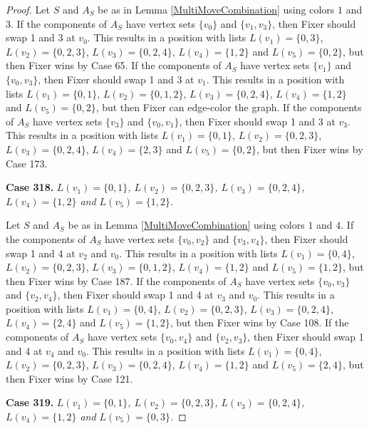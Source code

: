 \documentclass[12pt]{amsart}
\theoremstyle{plain}
\theoremstyle{definition}
\theoremstyle{remark}
\begin{document}
\begin{proof}
Let $S$ and $A_S$ be as in Lemma \ref{MultiMoveCombination} using colors $1$ and $3$. If the components of $A_S$ have vertex sets $\{v_0\}$ and $\{v_1, v_3\}$, then Fixer should swap 1 and 3 at $v_0$. This results in a position with lists $L(v_1) = \{0, 3\}$, $L(v_2) = \{0, 2, 3\}$, $L(v_3) = \{0, 2, 4\}$, $L(v_4) = \{1, 2\}$ and $L(v_5) = \{0, 2\}$, but then Fixer wins by Case 65. If the components of $A_S$ have vertex sets $\{v_1\}$ and $\{v_0, v_3\}$, then Fixer should swap 1 and 3 at $v_1$. This results in a position with lists $L(v_1) = \{0, 1\}$, $L(v_2) = \{0, 1, 2\}$, $L(v_3) = \{0, 2, 4\}$, $L(v_4) = \{1, 2\}$ and $L(v_5) = \{0, 2\}$, but then Fixer can edge-color the graph. If the components of $A_S$ have vertex sets $\{v_3\}$ and $\{v_0, v_1\}$, then Fixer should swap 1 and 3 at $v_3$. This results in a position with lists $L(v_1) = \{0, 1\}$, $L(v_2) = \{0, 2, 3\}$, $L(v_3) = \{0, 2, 4\}$, $L(v_4) = \{2, 3\}$ and $L(v_5) = \{0, 2\}$, but then Fixer wins by Case 173. 

\noindent\textbf{Case 318.  }\textit{$L(v_1) = \{0, 1\}$, $L(v_2) = \{0, 2, 3\}$, $L(v_3) = \{0, 2, 4\}$, $L(v_4) = \{1, 2\}$ and $L(v_5) = \{1, 2\}$.}

Let $S$ and $A_S$ be as in Lemma \ref{MultiMoveCombination} using colors $1$ and $4$. If the components of $A_S$ have vertex sets $\{v_0, v_2\}$ and $\{v_3, v_4\}$, then Fixer should swap 1 and 4 at $v_2$ and $v_0$. This results in a position with lists $L(v_1) = \{0, 4\}$, $L(v_2) = \{0, 2, 3\}$, $L(v_3) = \{0, 1, 2\}$, $L(v_4) = \{1, 2\}$ and $L(v_5) = \{1, 2\}$, but then Fixer wins by Case 187. If the components of $A_S$ have vertex sets $\{v_0, v_3\}$ and $\{v_2, v_4\}$, then Fixer should swap 1 and 4 at $v_3$ and $v_0$. This results in a position with lists $L(v_1) = \{0, 4\}$, $L(v_2) = \{0, 2, 3\}$, $L(v_3) = \{0, 2, 4\}$, $L(v_4) = \{2, 4\}$ and $L(v_5) = \{1, 2\}$, but then Fixer wins by Case 108. If the components of $A_S$ have vertex sets $\{v_0, v_4\}$ and $\{v_2, v_3\}$, then Fixer should swap 1 and 4 at $v_4$ and $v_0$. This results in a position with lists $L(v_1) = \{0, 4\}$, $L(v_2) = \{0, 2, 3\}$, $L(v_3) = \{0, 2, 4\}$, $L(v_4) = \{1, 2\}$ and $L(v_5) = \{2, 4\}$, but then Fixer wins by Case 121. 

\noindent\textbf{Case 319.  }\textit{$L(v_1) = \{0, 1\}$, $L(v_2) = \{0, 2, 3\}$, $L(v_3) = \{0, 2, 4\}$, $L(v_4) = \{1, 2\}$ and $L(v_5) = \{0, 3\}$.}


\end{proof}
\end{document}
